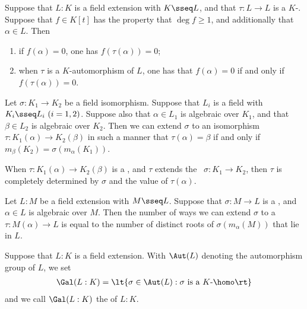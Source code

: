 \documentclass{article}
\begin{document}
  \begin{tproposition}
    Suppose that $ L:K $ is a field extension with $ K\sseq L $, and that $ \tau:L\to L $ is a $ K $-\homo .
    Suppose that $ f\in K[t] $ has the property that $ \deg f \geq 1 $, and additionally that $ \alpha\in L $.
    Then \begin{enumerate}[label=(\roman*)]
      \item if $ f(\alpha) = 0 $, one has $ f(\tau(\alpha)) = 0 $;
      \item when $ \tau $ is a $ K $-automorphism of $ L $, one has that $ f(\alpha) = 0 $ if and only if $ f(\tau(\alpha)) = 0 $.
    \end{enumerate}
  \end{tproposition}

  \begin{ttheorem}
    Let $ \sigma :K_1\to K_2 $ be a field isomorphism.
    Suppose that $ L_i $ is a field with $ K_i\sseq L_i\ (i=1,2) $.
    Suppose also that $ \alpha\in L_1 $ is algebraic over $ K_1 $, and that $ \beta\in L_2 $ is algebraic over $ K_2 $.
    Then we can extend $ \sigma $ to an isomorphism $ \tau:K_1(\alpha)\to K_2(\beta) $ in such a manner that $ \tau(\alpha) = \beta $ if and only if $ m_\beta(K_2) = \sigma(m_\alpha(K_1)) $.
  \end{ttheorem}

  \quad When $ \tau:K_1(\alpha)\to K_2(\beta) $ is a \homo, and $ \tau $ extends the \homo~$ \sigma:K_1\to K_2 $, then $ \tau $ is completely determined by $ \sigma $ and the value of $ \tau(\alpha) $.

  \begin{tcorollary}
    Let $ L:M $ be a field extension with $ M\sseq L $.
    Suppose that $ \sigma:M\to L $ is a \homo, and $ \alpha\in L $ is algebraic over $ M $.
    Then the number of ways we can extend $ \sigma $ to a \homo~$ \tau:M(\alpha)\to L $ is equal to the number of distinct roots of $ \sigma(m_\alpha(M)) $ that lie in $ L $.
  \end{tcorollary}

  \begin{tdefinition}
    Suppose that $ L:K $ is a field extension.
    With $ \Aut(L) $ denoting the automorphism group of $ L $, we set \begin{align*}
      \Gal(L:K) = \lt\{ \sigma\in \Aut(L) : \sigma \text{ is a $ K $-\homo} \rt\}
    \end{align*}
    and we call $ \Gal(L:K) $ the  of $ L:K $.
  \end{tdefinition}
\end{document}
